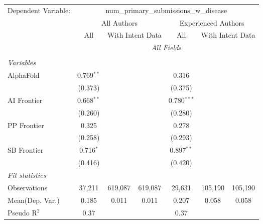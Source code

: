 \begingroup
\centering
\begin{tabular}{lcccccc}
   \tabularnewline \midrule \midrule
   Dependent Variable: & \multicolumn{6}{c}{num\_primary\_submissions\_w\_disease}\\
 & \multicolumn{3}{c}{All Authors} & \multicolumn{3}{c}{Experienced Authors} \\
\cmidrule(lr){2-4} \cmidrule(lr){5-7}
 & \multicolumn{1}{c}{All} & \multicolumn{2}{c}{With Intent Data} & \multicolumn{1}{c}{All} & \multicolumn{2}{c}{With Intent Data} \\
\cmidrule(lr){2-2} \cmidrule(lr){3-4} \cmidrule(lr){5-5} \cmidrule(lr){6-7}
 & \multicolumn{6}{c}{\textit{All Fields}} \\ \\
   \emph{Variables}\\
   AlphaFold    & 0.769$^{**}$ &         &         & 0.316         &         &   \\   
                & (0.373)      &         &         & (0.375)       &         &   \\   
   AI Frontier  & 0.668$^{**}$ &         &         & 0.780$^{***}$ &         &   \\   
                & (0.260)      &         &         & (0.280)       &         &   \\   
   PP Frontier  & 0.325        &         &         & 0.278         &         &   \\   
                & (0.258)      &         &         & (0.293)       &         &   \\   
   SB Frontier  & 0.716$^{*}$  &         &         & 0.897$^{**}$  &         &   \\   
                & (0.416)      &         &         & (0.420)       &         &   \\   
   \midrule
   \emph{Fit statistics}\\
   Observations & 37,211       & 619,087 & 619,087 & 29,631        & 105,190 & 105,190\\  
Mean(Dep. Var.) & 0.185 & 0.011 & 0.011 & 0.207 & 0.058 & 0.058 \\
   Pseudo R$^2$ & 0.37         &         &         & 0.37          &         & \\  
   

\end{tabular}
